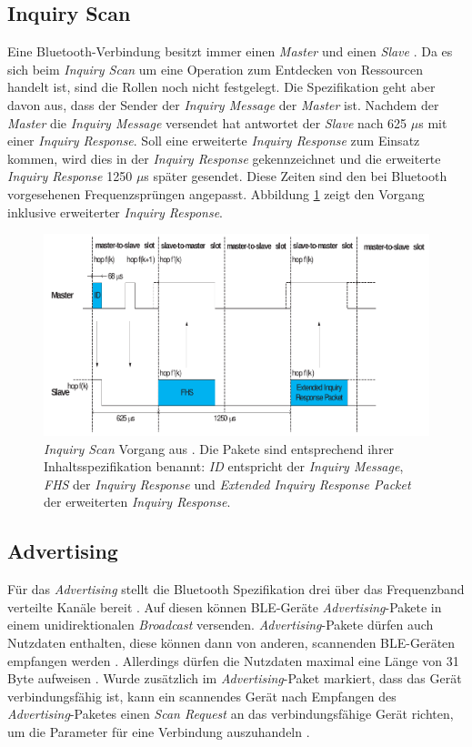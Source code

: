 \subsection{Inquiry Scan}
Eine Bluetooth-Verbindung besitzt immer einen \emph{Master} und einen \emph{Slave} \cite{blue2010inquiry}.
Da es sich beim \emph{Inquiry Scan} um eine Operation zum Entdecken von Ressourcen handelt ist, sind die Rollen noch nicht festgelegt. 
Die Spezifikation geht aber davon aus, dass der Sender der \emph{Inquiry Message} der \emph{Master} ist.
Nachdem der \emph{Master} die \emph{Inquiry Message} versendet hat antwortet der \emph{Slave} nach 625 $\mu$s mit einer \emph{Inquiry Response}. 
Soll eine erweiterte \emph{Inquiry Response} zum Einsatz kommen, wird dies in der \emph{Inquiry Response} gekennzeichnet und die erweiterte \emph{Inquiry Response} 1250 $\mu$s später gesendet.
Diese Zeiten sind den bei Bluetooth vorgesehenen Frequenzsprüngen angepasst.
Abbildung \ref{fig:inqscan} zeigt den Vorgang inklusive erweiterter \emph{Inquiry Response}.


\begin{figure}[h]
  \centering
	\includegraphics[width=\textwidth]{images/inqscan.png}
  \caption{\emph{Inquiry Scan} Vorgang aus \cite{blue2010inquiry}. Die Pakete sind entsprechend ihrer Inhaltsspezifikation benannt: \emph{ID} entspricht der \emph{Inquiry Message}, \emph{FHS} der \emph{Inquiry Response} und \emph{Extended Inquiry Response Packet} der erweiterten \emph{Inquiry Response}.}
  \label{fig:inqscan}
\end{figure}

\subsection{Advertising}
Für das \emph{Advertising} stellt die Bluetooth Spezifikation drei über das Frequenzband verteilte Kanäle bereit \cite{blue2010channel}.
Auf diesen können BLE-Geräte \emph{Advertising}-Pakete in einem unidirektionalen \emph{Broadcast} versenden.
\emph{Advertising}-Pakete dürfen auch Nutzdaten enthalten, diese können dann von anderen, scannenden BLE-Geräten empfangen werden \cite{blue2010advertising}.
Allerdings dürfen die Nutzdaten maximal eine Länge von 31 Byte aufweisen \cite{blue2010pdu}.
Wurde zusätzlich im \emph{Advertising}-Paket markiert, dass das Gerät verbindungsfähig ist, kann ein scannendes Gerät nach Empfangen des \emph{Advertising}-Paketes einen \emph{Scan Request} an das verbindungsfähige Gerät richten, um die Parameter für eine Verbindung auszuhandeln \cite{blue2010scanning}.

